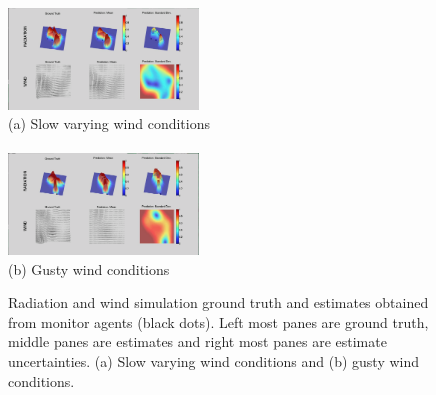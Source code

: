 \begin{figure}[ht]
\begin{center}
\includegraphics[width=0.45\textwidth]{figures/radiation_ss_calm.png}\\
(a) Slow varying wind conditions\\ \ \\
\includegraphics[width=0.45\textwidth]{figures/radiation_ss_gust.png}\\
(b) Gusty wind conditions
\caption{\label{radiation_screen_shots} Radiation and wind simulation ground truth and estimates obtained from monitor agents (black dots).  Left most panes are ground truth, middle panes are estimates and right most panes are estimate uncertainties.  (a) Slow varying wind conditions and (b) gusty wind conditions.}
\end{center}
\end{figure}
